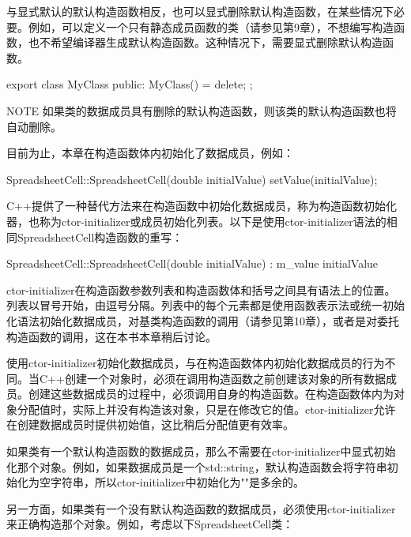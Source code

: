 
与显式默认的默认构造函数相反，也可以显式删除默认构造函数，在某些情况下必要。例如，可以定义一个只有静态成员函数的类（请参见第9章），不想编写构造函数，也不希望编译器生成默认构造函数。这种情况下，需要显式删除默认构造函数。

\begin{cpp}
export class MyClass
{
    public:
        MyClass() = delete;
};
\end{cpp}

\begin{myNotic}{NOTE}
如果类的数据成员具有删除的默认构造函数，则该类的默认构造函数也将自动删除。
\end{myNotic}


目前为止，本章在构造函数体内初始化了数据成员，例如：

\begin{cpp}
SpreadsheetCell::SpreadsheetCell(double initialValue)
{
    setValue(initialValue);
}
\end{cpp}

C++提供了一种替代方法来在构造函数中初始化数据成员，称为构造函数初始化器，也称为ctor-initializer或成员初始化列表。以下是使用ctor-initializer语法的相同SpreadsheetCell构造函数的重写：

\begin{cpp}
SpreadsheetCell::SpreadsheetCell(double initialValue)
: m_value { initialValue }
{}
\end{cpp}

ctor-initializer在构造函数参数列表和构造函数体和括号之间具有语法上的位置。列表以冒号开始，由逗号分隔。列表中的每个元素都是使用函数表示法或统一初始化语法初始化数据成员，对基类构造函数的调用（请参见第10章），或者是对委托构造函数的调用，这在本书本章稍后讨论。

使用ctor-initializer初始化数据成员，与在构造函数体内初始化数据成员的行为不同。当C++创建一个对象时，必须在调用构造函数之前创建该对象的所有数据成员。创建这些数据成员的过程中，必须调用自身的构造函数。在构造函数体内为对象分配值时，实际上并没有构造该对象，只是在修改它的值。ctor-initializer允许在创建数据成员时提供初始值，这比稍后分配值更有效率。

如果类有一个默认构造函数的数据成员，那么不需要在ctor-initializer中显式初始化那个对象。例如，如果数据成员是一个std::string，默认构造函数会将字符串初始化为空字符串，所以ctor-initializer中初始化为""是多余的。

另一方面，如果类有一个没有默认构造函数的数据成员，必须使用ctor-initializer来正确构造那个对象。例如，考虑以下SpreadsheetCell类：

